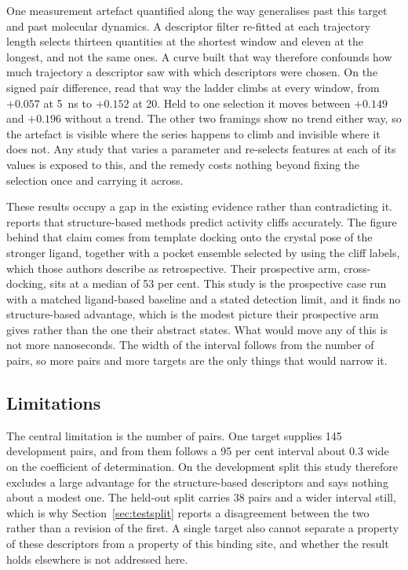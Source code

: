 One measurement artefact quantified along the way generalises past this target and past
molecular dynamics. A descriptor filter re-fitted at each trajectory length selects
thirteen quantities at the shortest window and eleven at the longest, and not the same
ones. A curve built that way therefore confounds how much trajectory a descriptor saw
with which descriptors were chosen. On the signed pair difference, read that way the ladder climbs at every window, from
$+0.057$ at \SI{5}{\nano\second} to $+0.152$ at 20. Held to one selection it moves
between $+0.149$ and $+0.196$ without a trend. The other two framings show no trend
either way, so the artefact is visible where the series happens to climb and invisible
where it does not. Any study that
varies a parameter and re-selects features at each of its values is exposed to this,
and the remedy costs nothing beyond fixing the selection once and carrying it across.

These results occupy a gap in the existing evidence rather than contradicting it.
\citet{husby2015} reports that structure-based methods predict activity cliffs
accurately. The figure behind that claim comes from template docking onto the crystal
pose of the stronger ligand, together with a pocket ensemble selected by using the
cliff labels, which those authors describe as retrospective. Their prospective arm,
cross-docking, sits at a median of 53 per cent. This study is the prospective case run
with a matched ligand-based baseline and a stated detection limit, and it finds no
structure-based advantage, which is the modest picture their prospective arm gives
rather than the one their abstract states. What would move any of this is
not more nanoseconds. The width of the interval follows from the number of pairs, so
more pairs and more targets are the only things that would narrow it.

\subsection{Limitations}

The central limitation is the number of pairs. One target supplies 145 development
pairs, and from them follows a 95 per cent interval about $0.3$ wide on the coefficient
of determination. On the development split this study therefore excludes a large
advantage for the structure-based descriptors and says nothing about a modest one. The
held-out split carries 38 pairs and a wider interval still, which is why
Section~\ref{sec:testsplit} reports a disagreement between the two rather than a
revision of the first. A single target also cannot separate a property of these
descriptors from a property of this binding site, and whether the result holds elsewhere
is not addressed here.

